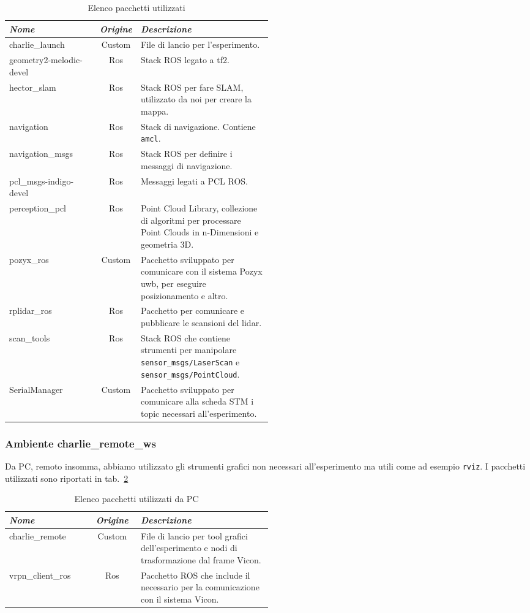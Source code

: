 \begin{table}[h]
	\centering
	\begin{tabular}{lcp{0.5\linewidth}}
		\textit{Nome} 	& \textit{Origine} & \textit{Descrizione} \\
		\hline
		charlie\_launch				& Custom	& File di lancio per l'esperimento.\\
		geometry2-melodic-devel		& Ros		& Stack ROS legato a tf2.\\
		hector\_slam				& Ros		& Stack ROS per fare SLAM, utilizzato da noi per creare la mappa.\\
		navigation					& Ros		& Stack di navigazione. Contiene \verb|amcl|.\\
		navigation\_msgs			& Ros		& Stack ROS per definire i messaggi di navigazione.\\
		pcl\_msgs-indigo-devel		& Ros		& Messaggi legati a PCL ROS.\\
		perception\_pcl				& Ros		& Point Cloud Library, collezione di algoritmi per processare Point Clouds in n-Dimensioni e geometria 3D.\\ 
		pozyx\_ros					& Custom	& Pacchetto sviluppato per comunicare con il sistema Pozyx uwb, per eseguire posizionamento e altro.\\
		rplidar\_ros				& Ros		& Pacchetto per comunicare e pubblicare le scansioni del lidar.\\
		scan\_tools					& Ros		& Stack ROS che contiene strumenti per manipolare \verb|sensor_msgs/LaserScan| e \verb|sensor_msgs/PointCloud|.\\
		SerialManager				& Custom	& Pacchetto sviluppato per comunicare alla scheda STM i topic necessari all'esperimento.\\
	\end{tabular}
	\caption{Elenco pacchetti utilizzati}
	\label{tab: pacchetti charlie}
\end{table}
\FloatBarrier
	
\subsubsection*{Ambiente charlie\_remote\_ws}
Da PC, remoto insomma, abbiamo utilizzato gli strumenti grafici non necessari all'esperimento ma utili come ad esempio \verb|rviz|. I pacchetti utilizzati sono riportati in tab.~\ref{tab: pacchetti remoto}
\begin{table}[h]
	\centering
	\begin{tabular}{lcp{0.5\linewidth}}
		\textit{Nome} 	& \textit{Origine} & \textit{Descrizione} \\
		\hline
		charlie\_remote			& Custom	& File di lancio per tool grafici dell'esperimento e nodi di trasformazione dal frame Vicon.\\
		vrpn\_client\_ros		& Ros		& Pacchetto ROS che include il necessario per la comunicazione con il sistema Vicon.\\
	\end{tabular}
	\caption{Elenco pacchetti utilizzati da PC}
	\label{tab: pacchetti remoto}
\end{table}
\FloatBarrier

